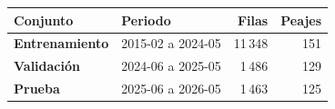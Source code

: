 \renewcommand{\arraystretch}{1.2}
\begin{tabular}{|l|l|r|r|}
\hline
\rowcolor{gray!20} \textbf{Conjunto} & \textbf{Periodo} & \textbf{Filas} & \textbf{Peajes} \\
\hline
\textbf{Entrenamiento} & 2015-02 a 2024-05 & 11\,348 & 151 \\
\hline
\textbf{Validación} & 2024-06 a 2025-05 & 1\,486 & 129 \\
\hline
\textbf{Prueba} & 2025-06 a 2026-05 & 1\,463 & 125 \\
\hline
\end{tabular}
